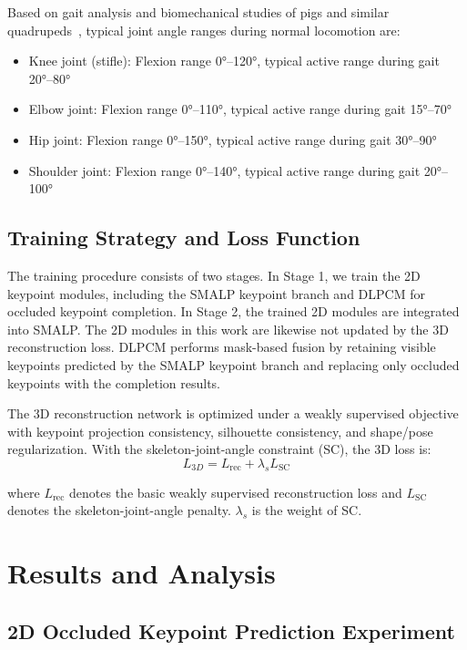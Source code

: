 \documentclass[runningheads]{llncs}
\begin{document}
Based on gait analysis and biomechanical studies of pigs and similar quadrupeds~\cite{ref29,ref30,ref31}, typical joint angle ranges during normal locomotion are:

\begin{itemize}
\item Knee joint (stifle): Flexion range 0°--120°, typical active range during gait 20°--80°
\item Elbow joint: Flexion range 0°--110°, typical active range during gait 15°--70°
\item Hip joint: Flexion range 0°--150°, typical active range during gait 30°--90°
\item Shoulder joint: Flexion range 0°--140°, typical active range during gait 20°--100°
\end{itemize}

\subsection{Training Strategy and Loss Function}
\label{subsec:training}

The training procedure consists of two stages. In Stage 1, we train the 2D keypoint modules, including the SMALP keypoint branch and DLPCM for occluded keypoint completion. In Stage 2, the trained 2D modules are integrated into SMALP. The 2D modules in this work are likewise not updated by the 3D reconstruction loss. DLPCM performs mask-based fusion by retaining visible keypoints predicted by the SMALP keypoint branch and replacing only occluded keypoints with the completion results.

The 3D reconstruction network is optimized under a weakly supervised objective with keypoint projection consistency, silhouette consistency, and shape/pose regularization. With the skeleton-joint-angle constraint (SC), the 3D loss is:
\begin{equation}
L_{3D} = L_{\text{rec}} + \lambda_s L_{\text{SC}}
\label{eq:3d_loss}
\end{equation}

where $L_{\text{rec}}$ denotes the basic weakly supervised reconstruction loss and $L_{\text{SC}}$ denotes the skeleton-joint-angle penalty. $\lambda_s$ is the weight of SC.

\section{Results and Analysis}
\label{sec:results}

\subsection{2D Occluded Keypoint Prediction Experiment}
\label{subsec:2d_results}
\end{document}
